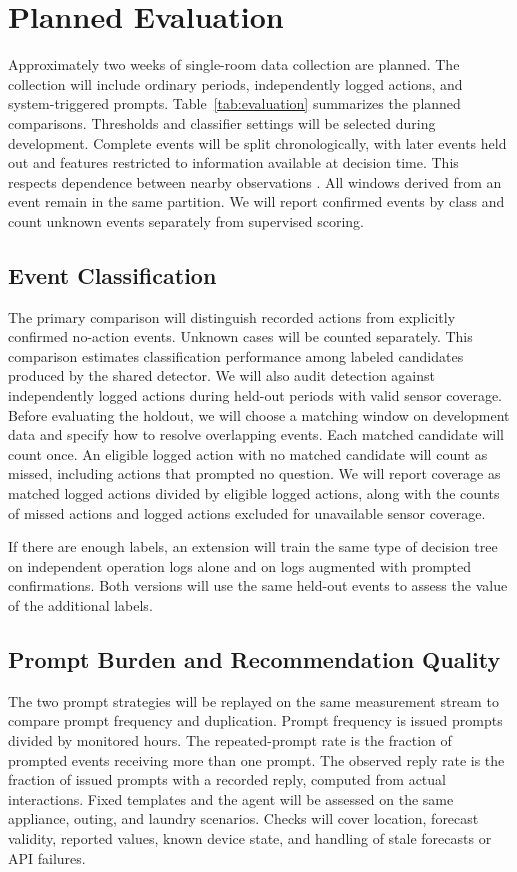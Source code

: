 \section{Planned Evaluation}
Approximately two weeks of single-room data collection are planned. The collection will include ordinary periods, independently logged actions, and system-triggered prompts. Table~\ref{tab:evaluation} summarizes the planned comparisons. Thresholds and classifier settings will be selected during development. Complete events will be split chronologically, with later events held out and features restricted to information available at decision time. This respects dependence between nearby observations \cite{roberts2017cv}. All windows derived from an event remain in the same partition. We will report confirmed events by class and count unknown events separately from supervised scoring.



\subsection{Event Classification}
The primary comparison will distinguish recorded actions from explicitly confirmed no-action events. Unknown cases will be counted separately. This comparison estimates classification performance among labeled candidates produced by the shared detector. We will also audit detection against independently logged actions during held-out periods with valid sensor coverage. Before evaluating the holdout, we will choose a matching window on development data and specify how to resolve overlapping events. Each matched candidate will count once. An eligible logged action with no matched candidate will count as missed, including actions that prompted no question. We will report coverage as matched logged actions divided by eligible logged actions, along with the counts of missed actions and logged actions excluded for unavailable sensor coverage.

If there are enough labels, an extension will train the same type of decision tree on independent operation logs alone and on logs augmented with prompted confirmations. Both versions will use the same held-out events to assess the value of the additional labels.

\subsection{Prompt Burden and Recommendation Quality}
The two prompt strategies will be replayed on the same measurement stream to compare prompt frequency and duplication. Prompt frequency is issued prompts divided by monitored hours. The repeated-prompt rate is the fraction of prompted events receiving more than one prompt. The observed reply rate is the fraction of issued prompts with a recorded reply, computed from actual interactions. Fixed templates and the agent will be assessed on the same appliance, outing, and laundry scenarios. Checks will cover location, forecast validity, reported values, known device state, and handling of stale forecasts or API failures.

